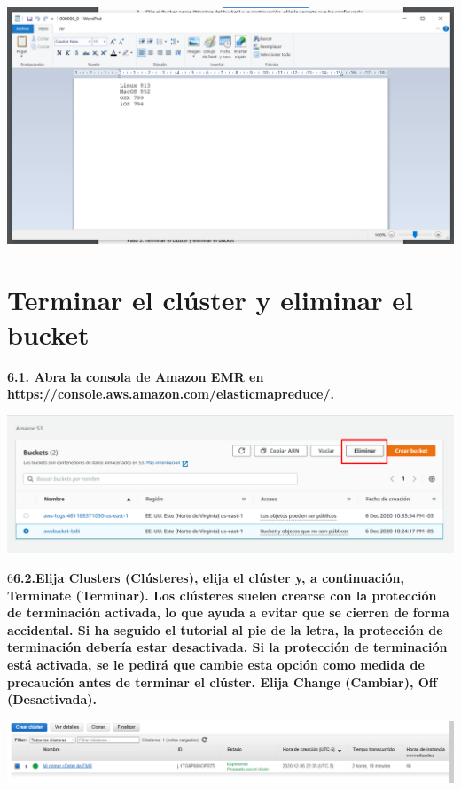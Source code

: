 \documentclass{article}
\begin{document}
    \begin{center}
		\includegraphics[width=15cm]{./images/32} 
	\end{center}

\newpage

\section{ Terminar el clúster y eliminar el bucket  }

\textbf{6.1. Abra la consola de Amazon EMR en https://console.aws.amazon.com/elasticmapreduce/.  }

    \begin{center}
		\includegraphics[width=15cm]{./images/33} 
	\end{center}
6\textbf{6.2.Elija Clusters (Clústeres), elija el clúster y, a continuación, Terminate (Terminar).
Los clústeres suelen crearse con la protección de terminación activada, lo que ayuda a evitar que se
cierren de forma accidental. Si ha seguido el tutorial al pie de la letra, la protección de terminación
debería estar desactivada. Si la protección de terminación está activada, se le pedirá que cambie esta
opción como medida de precaución antes de terminar el clúster. Elija Change (Cambiar), Off
(Desactivada).   }

    \begin{center}
		\includegraphics[width=15cm]{./images/34} 
	\end{center}
\end{document}
